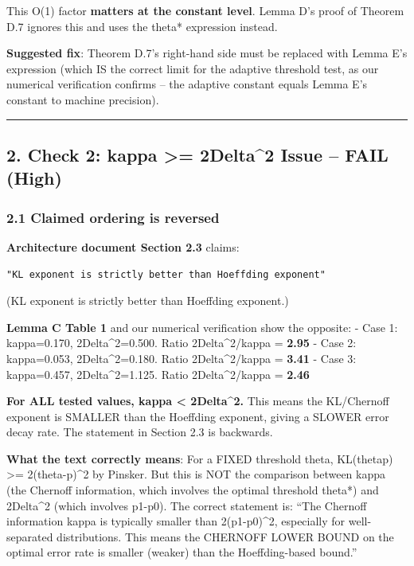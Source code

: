 \documentclass[
  12pt,
]{article}
\begin{document}
This O(1) factor \textbf{matters at the constant level}. Lemma D's proof
of Theorem D.7 ignores this and uses the theta* expression instead.

\textbf{Suggested fix}: Theorem D.7's right-hand side must be replaced
with Lemma E's expression (which IS the correct limit for the adaptive
threshold test, as our numerical verification confirms -- the adaptive
constant equals Lemma E's constant to machine precision).

\begin{center}\rule{0.5\linewidth}{0.5pt}\end{center}

\subsection{2. Check 2: kappa \textgreater= 2Delta\^{}2 Issue -- FAIL
(High)}\label{check-2-kappa-2delta2-issue-fail-high}

\subsubsection{2.1 Claimed ordering is
reversed}\label{claimed-ordering-is-reversed}

\textbf{Architecture document Section 2.3} claims:

\begin{verbatim}
"KL exponent is strictly better than Hoeffding exponent"
\end{verbatim}

(KL exponent is strictly better than Hoeffding exponent.)

\textbf{Lemma C Table 1} and our numerical verification show the
opposite: - Case 1: kappa=0.170, 2Delta\^{}2=0.500. Ratio
2Delta\^{}2/kappa = \textbf{2.95} - Case 2: kappa=0.053,
2Delta\^{}2=0.180. Ratio 2Delta\^{}2/kappa = \textbf{3.41} - Case 3:
kappa=0.457, 2Delta\^{}2=1.125. Ratio 2Delta\^{}2/kappa = \textbf{2.46}

\textbf{For ALL tested values, kappa \textless{} 2Delta\^{}2.} This
means the KL/Chernoff exponent is SMALLER than the Hoeffding exponent,
giving a SLOWER error decay rate. The statement in Section 2.3 is
backwards.

\textbf{What the text correctly means}: For a FIXED threshold theta,
KL(theta\textbar\textbar p) \textgreater= 2(theta-p)\^{}2 by Pinsker.
But this is NOT the comparison between kappa (the Chernoff information,
which involves the optimal threshold theta*) and 2Delta\^{}2 (which
involves p1-p0). The correct statement is: ``The Chernoff information
kappa is typically smaller than 2(p1-p0)\^{}2, especially for
well-separated distributions. This means the CHERNOFF LOWER BOUND on the
optimal error rate is smaller (weaker) than the Hoeffding-based bound.''
\end{document}
